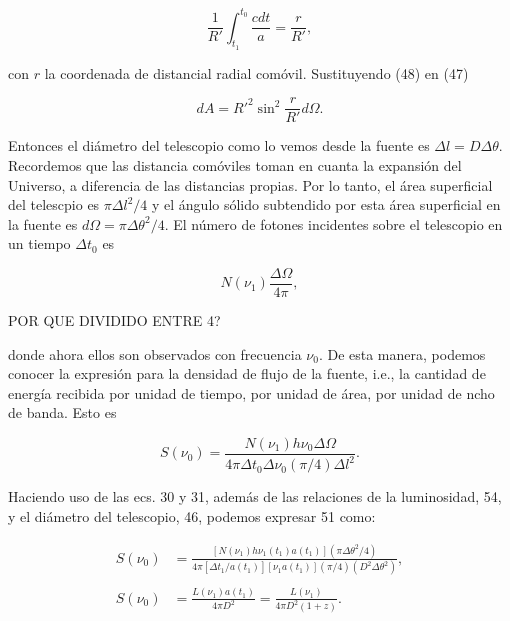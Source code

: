 \documentclass[11pt]{article}
\begin{document}
    \begin{equation}
        \frac{1}{R'} \int_{t_1}^{t_0}{\frac{c dt}{a}} =     \frac{r}{R'},
    \end{equation}


    con $r$ la coordenada de distancial radial comóvil. Sustituyendo (48) en (47)

    \begin{equation}
        dA = R'^2 \sin^2 \frac{r}{R'} d\Omega.
    \end{equation} 

    Entonces el diámetro del telescopio como lo vemos desde la fuente es $\Delta l = D \Delta \theta$. Recordemos que las distancia comóviles toman en cuanta la expansión del Universo, a diferencia de las distancias propias. Por lo tanto, el área superficial del telescpio es $\pi \Delta l^2 / 4$ y el ángulo sólido subtendido por esta área superficial en la fuente es $d \Omega = \pi \Delta \theta^2/4$. El número de fotones incidentes sobre el telescopio en un tiempo $\Delta t_0$ es 
    
    \begin{equation}
        N (\nu_1) \frac{\Delta \Omega}{4 \pi},
    \end{equation}

    POR QUE DIVIDIDO ENTRE 4? 
    
    donde ahora ellos son observados con frecuencia $\nu_0$. De esta manera, podemos conocer la expresión para la densidad de flujo de la fuente, i.e., la cantidad de energía recibida por unidad de tiempo, por unidad de área, por unidad de ncho de banda. Esto es
    
    \begin{equation}
        S(\nu_0) = \frac{N (\nu_1) h \nu_0 \Delta \Omega} {4\pi \Delta t_0 \Delta \nu_0 (\pi/4)\Delta l^2 }.
    \end{equation}

    Haciendo uso de las ecs. 30 y 31, además de las relaciones de la luminosidad, 54, y el diámetro del telescopio, 46, podemos expresar 51 como: 
    
    \begin{align}
        S( \nu_0) & = \frac{[N(\nu_1) h \nu_1 (t_1) a(t_1)] (\pi \Delta \theta^2/4)}{4 \pi [\Delta t_1/a(t_1)] [\nu_1 a(t_1)] (\pi/4)(D^2 \Delta \theta^2)}, \\ 
        \\
        S(\nu_0) & = \frac{L(\nu_1) a(t_1)}{4\pi D^2} =\frac{L(\nu_1)}{4\pi D^2(1+z)}.
    \end{align}
\end{document}
